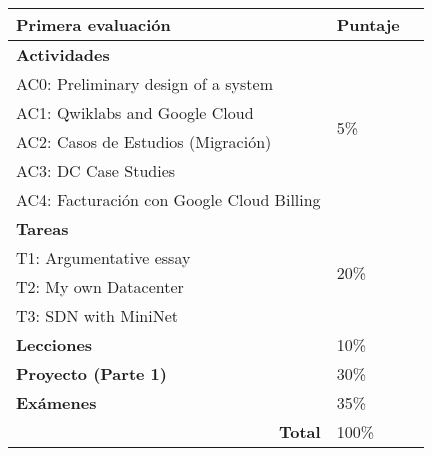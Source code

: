 \begin{table}[!htbp]
\begin{tabular}{p{}ll@{}}
\toprule
\textbf{Primera evaluación}           & \multicolumn{1}{l}{\textbf{Puntaje}} \\ \midrule
\textbf{Actividades}            & \multirow{6}{*}{5\%}                 \\
AC0:   Preliminary design of a system &                                      \\
AC1:   Qwiklabs and Google Cloud      &                                      \\
AC2: Casos de Estudios (Migración) & 
\\
AC3: DC Case Studies                  &                                      \\
AC4: Facturación con Google Cloud Billing              &                                      \\\midrule
\textbf{Tareas}                 & \multirow{4}{*}{20\%}                \\
T1:   Argumentative essay             &                                      \\
T2:   My own Datacenter               &                                      \\
T3:   SDN with MiniNet                &                                      \\ \midrule
\textbf{Lecciones}             & 10\%                                 \\ \midrule
\textbf{Proyecto (Parte   1)}   & 30\%                                 \\ \midrule
\textbf{Exámenes}               & 35\%                                 \\ \midrule
\multicolumn{1}{r}{\textbf{Total}}    & 100\%                                \\ \bottomrule
\end{tabular}
\end{table}



